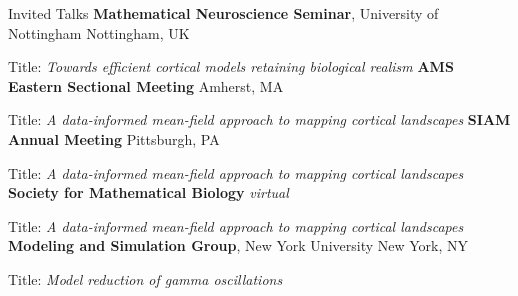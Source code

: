 \begin{rubric}{Invited Talks}
\entry*[2022.10]%
	\textbf{Mathematical Neuroscience Seminar}, University of Nottingham \hfill Nottingham, UK
	\par Title: \textit{Towards efficient cortical models retaining biological realism}
\entry*[2022.10]%
	\textbf{AMS Eastern Sectional Meeting} \hfill Amherst, MA
    \par Title: \textit{A data-informed mean-field approach to mapping cortical landscapes}
\entry*[2022.07]%
    \textbf{SIAM Annual Meeting} \hfill Pittsburgh, PA
    \par Title: \textit{A data-informed mean-field approach to mapping cortical landscapes}
\entry*[2021.06]%
    \textbf{Society for Mathematical Biology} \hfill \textit{virtual}
    \par Title: \textit{A data-informed mean-field approach to mapping cortical landscapes}
\entry*[2021.04]%
    \textbf{Modeling and Simulation Group}, New York University \hfill New York, NY
    \par Title: \textit{Model reduction of gamma oscillations}
\end{rubric}
